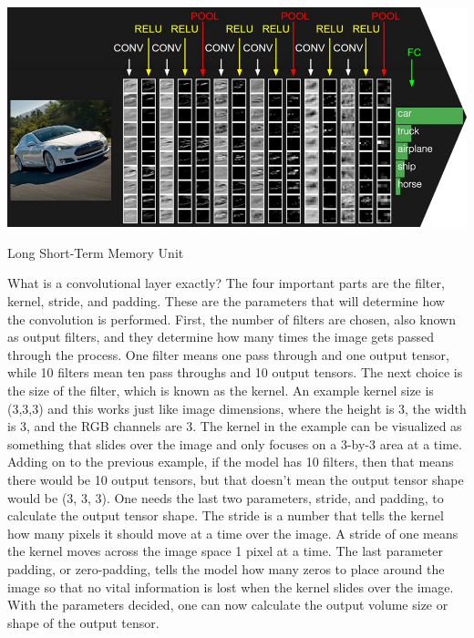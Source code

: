 \documentclass[12pt]{article}
\begin{document}
                \begin{table}[ht]
            
                    \begin{center}
    
                        \includegraphics[scale=0.65]{cnn-overview.png}
                        \caption{Long Short-Term Memory Unit \cite{cs231n2023}}
                        \label{cnn-overview-fig}
            
                    \end{center}
                    
                \end{table}
    

                What is a convolutional layer exactly? The four important parts are the filter, kernel, stride, and padding. 
                These are the parameters that will determine how the convolution is performed. 
                First, the number of filters are chosen, also known as output filters, 
                and they determine how many times the image gets passed through the process. 
                One filter means one pass through and one output tensor, while 10 filters mean ten pass throughs and 10 output tensors. 
                The next choice is the size of the filter, which is known as the kernel. 
                An example kernel size is (3,3,3) and this works just like image dimensions, 
                where the height is 3, the width is 3, and the RGB channels are 3. 
                The kernel in the example can be visualized as something that slides over the image 
                and only focuses on a 3-by-3 area at a time. Adding on to the previous example, if the model has 10 filters, 
                then that means there would be 10 output tensors, but that doesn’t mean the output tensor shape would be (3, 3, 3). 
                One needs the last two parameters, stride, and padding, to calculate the output tensor shape. 
                The stride is a number that tells the kernel how many pixels it should move at a time over the image. 
                A stride of one means the kernel moves across the image space 1 pixel at a time. 
                The last parameter padding, or zero-padding, tells the model how many zeros to place around the image 
                so that no vital information is lost when the kernel slides over the image. With the parameters decided, 
                one can now calculate the output volume size or shape of the output tensor.
                
\end{document}
